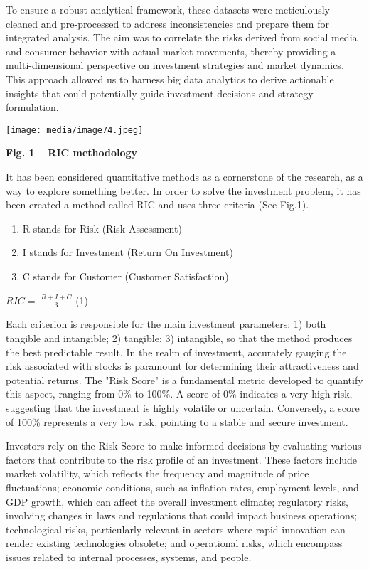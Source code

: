 \documentclass[
]{article}
\begin{document}
To ensure a robust analytical framework, these datasets were
meticulously cleaned and pre-processed to address inconsistencies and
prepare them for integrated analysis. The aim was to correlate the risks
derived from social media and consumer behavior with actual market
movements, thereby providing a multi-dimensional perspective on
investment strategies and market dynamics. This approach allowed us to
harness big data analytics to derive actionable insights that could
potentially guide investment decisions and strategy formulation.

\texttt{[image: media/image74.jpeg]}

\textbf{Fig. 1 -- RIC methodology}

It has been considered quantitative methods as a cornerstone of the
research, as a way to explore something better. In order to solve the
investment problem, it has been created a method called RIC and uses
three criteria (See Fig.1).

\begin{enumerate}
\def\labelenumi{\arabic{enumi})}
\item
  R stands for Risk (Risk Assessment)
\item
  I stands for Investment (Return On Investment)
\item
  C stands for Customer (Customer Satisfaction)
\end{enumerate}

\(RIC = \ \frac{R + I + C}{3}\) (1)

Each criterion is responsible for the main investment parameters: 1)
both tangible and intangible; 2) tangible; 3) intangible, so that the
method produces the best predictable result. In the realm of investment,
accurately gauging the risk associated with stocks is paramount for
determining their attractiveness and potential returns. The "Risk Score"
is a fundamental metric developed to quantify this aspect, ranging from
0\% to 100\%. A score of 0\% indicates a very high risk, suggesting that
the investment is highly volatile or uncertain. Conversely, a score of
100\% represents a very low risk, pointing to a stable and secure
investment.

Investors rely on the Risk Score to make informed decisions by
evaluating various factors that contribute to the risk profile of an
investment. These factors include market volatility, which reflects the
frequency and magnitude of price fluctuations; economic conditions, such
as inflation rates, employment levels, and GDP growth, which can affect
the overall investment climate; regulatory risks, involving changes in
laws and regulations that could impact business operations;
technological risks, particularly relevant in sectors where rapid
innovation can render existing technologies obsolete; and operational
risks, which encompass issues related to internal processes, systems,
and people.
\end{document}
